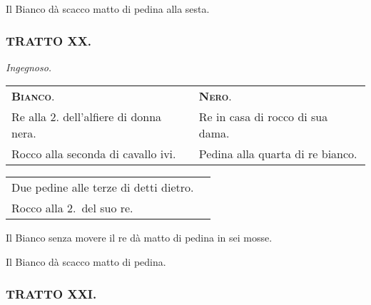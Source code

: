 \documentclass[11pt,a6paper]{article}
\begin{document}
Il Bianco dà scacco matto di pedina alla sesta.

\subsubsection{TRATTO XX.}
\hfill\textit{\footnotesize Ingegnoso.}

{\small\noindent\begin{tabular}{@{}p{3.84cm}p{3.84cm}}
 {\bfseries\scshape Bianco}. &{\bfseries\scshape Nero}. \\
Re alla 2. dell'alfiere di donna nera. &Re in casa di rocco di sua dama.\\
Rocco alla seconda di cavallo ivi. & Pedina alla quarta di re bianco.
\end{tabular}

\noindent\begin{tabular}{@{}p{3.84cm}p{3.84cm}}
Due pedine alle terze di detti dietro. \\
Rocco alla 2.\ del suo re. \\
\end{tabular}}

Il Bianco senza movere il re dà matto di pedina in
sei mosse.


Il Bianco dà scacco matto di pedina.

\subsubsection{TRATTO XXI.}
\end{document}
